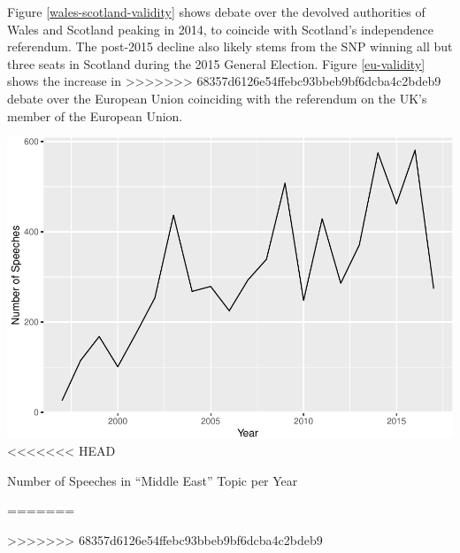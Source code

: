 \documentclass[]{article}
\let\origfigure\figure
\let\endorigfigure\endfigure
\renewenvironment{figure}[1][2] {
    \expandafter\origfigure\expandafter[H]
} {
    \endorigfigure
}
\theoremstyle{definition}
\theoremstyle{definition}
\theoremstyle{definition}
\theoremstyle{remark}
\begin{document}
\begin{table}[H]
\begin{table}[H]
\begin{table}[H]
\begin{table}[H]
\begin{table}[H]
\begin{table}[H]
\begin{table}[H]
\begin{table}[H]
Figure \ref{wales-scotland-validity} shows debate over the devolved
authorities of Wales and Scotland peaking in 2014, to coincide with
Scotland's independence referendum. The post-2015 decline also likely
stems from the SNP winning all but three seats in Scotland during the
2015 General Election. Figure \ref{eu-validity} shows the increase in
>>>>>>> 68357d6126e54ffebc93bbeb9bf6dcba4c2bdeb9
debate over the European Union coinciding with the referendum on the
UK's member of the European Union.

\begin{figure}
\centering
\includegraphics{methodology_files/figure-latex/middle-east-plot-1.pdf}
<<<<<<< HEAD
\caption{\label{fig:middle-east-plot}Number of Speeches in ``Middle East''
Topic per Year}
=======
\caption{\label{middle-east-plot-validity}Number of Speeches in ``Middle
East'' Topic per Year}
>>>>>>> 68357d6126e54ffebc93bbeb9bf6dcba4c2bdeb9
\end{figure}


\end{table}
\end{table}
\end{table}
\end{table}
\end{table}
\end{table}
\end{table}
\end{table}
\end{document}
